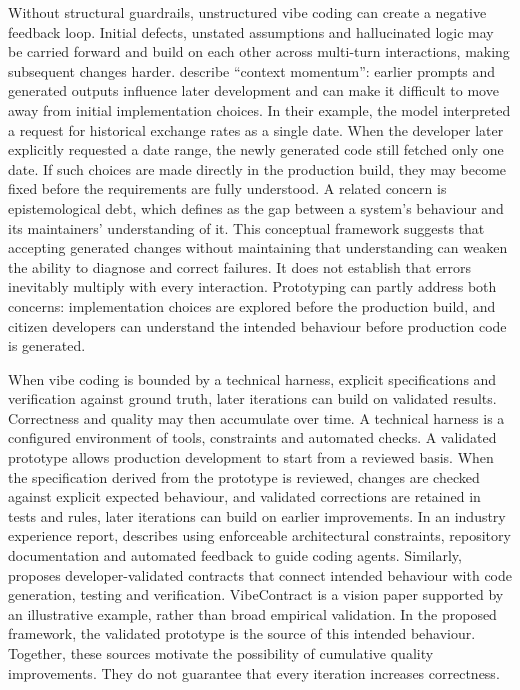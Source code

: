\documentclass[10pt,a4paper]{article}
\begin{document}
Without structural guardrails, unstructured vibe coding can create a negative feedback loop. Initial defects, unstated assumptions and hallucinated logic may be carried forward and build on each other across multi-turn interactions, making subsequent changes harder. \textcite{sarkar2025} describe “context momentum”: earlier prompts and generated outputs influence later development and can make it difficult to move away from initial implementation choices. In their example, the model interpreted a request for historical exchange rates as a single date. When the developer later explicitly requested a date range, the newly generated code still fetched only one date. If such choices are made directly in the production build, they may become fixed before the requirements are fully understood. A related concern is epistemological debt, which \textcite{ginac2026} defines as the gap between a system’s behaviour and its maintainers’ understanding of it. This conceptual framework suggests that accepting generated changes without maintaining that understanding can weaken the ability to diagnose and correct failures. It does not establish that errors inevitably multiply with every interaction. Prototyping can partly address both concerns: implementation choices are explored before the production build, and citizen developers can understand the intended behaviour before production code is generated.

 When vibe coding is bounded by a technical harness, explicit specifications and verification against ground truth, later iterations can build on validated results. Correctness and quality may then accumulate over time. A technical harness is a configured environment of tools, constraints and automated checks. A validated prototype allows production development to start from a reviewed basis. When the specification derived from the prototype is reviewed, changes are checked against explicit expected behaviour, and validated corrections are retained in tests and rules, later iterations can build on earlier improvements. In an industry experience report, \textcite{lopopolo2026HarnessEngineering} describes using enforceable architectural constraints, repository documentation and automated feedback to guide coding agents. Similarly, \textcite{wang2026vibecontract} proposes developer-validated contracts that connect intended behaviour with code generation, testing and verification. VibeContract is a vision paper supported by an illustrative example, rather than broad empirical validation. In the proposed framework, the validated prototype is the source of this intended behaviour. Together, these sources motivate the possibility of cumulative quality improvements. They do not guarantee that every iteration increases correctness.
\end{document}

